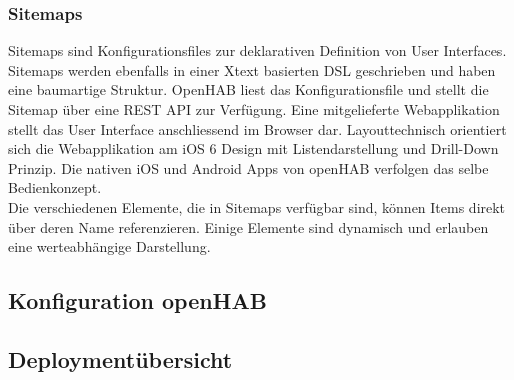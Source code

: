 \subsubsection{Sitemaps}
Sitemaps sind Konfigurationsfiles zur deklarativen Definition von User Interfaces. Sitemaps werden ebenfalls in einer Xtext basierten DSL geschrieben und haben eine baumartige Struktur. OpenHAB liest das Konfigurationsfile und stellt die Sitemap über eine REST API zur Verfügung. Eine mitgelieferte Webapplikation stellt das User Interface anschliessend im Browser dar. Layouttechnisch orientiert sich die Webapplikation am iOS 6 Design mit Listendarstellung und Drill-Down Prinzip. Die nativen iOS und Android Apps von openHAB verfolgen das selbe Bedienkonzept.\\
Die verschiedenen Elemente, die in Sitemaps verfügbar sind, können Items direkt über deren Name referenzieren. Einige Elemente sind dynamisch und erlauben eine werteabhängige Darstellung.




\pagebreak

\subsection{Konfiguration openHAB}




\subsection{Deploymentübersicht}

